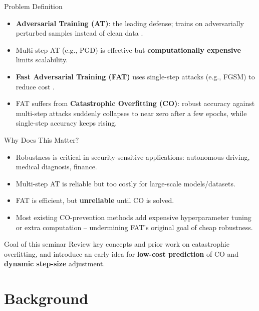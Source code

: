 \documentclass[11pt,aspectratio=169]{beamer}
\begin{document}
\begin{frame}{Problem Definition}
  \begin{itemize}
    \item \textbf{Adversarial Training (AT)}: the leading defense; trains on adversarially perturbed samples instead of clean data \cite{madry2018towards}.
    \item Multi-step AT (e.g., PGD) is effective but \textbf{computationally expensive} -- limits scalability.
    \item \textbf{Fast Adversarial Training (FAT)} uses single-step attacks (e.g., FGSM) to reduce cost \cite{wong2020fast}.
    \item FAT suffers from \textbf{Catastrophic Overfitting (CO)}: robust accuracy against multi-step attacks suddenly collapses to near zero after a few epochs, while single-step accuracy keeps rising.
  \end{itemize}
\end{frame}

\begin{frame}{Why Does This Matter?}
  \begin{itemize}
    \item Robustness is critical in security-sensitive applications: autonomous driving, medical diagnosis, finance.
    \item Multi-step AT is reliable but too costly for large-scale models/datasets.
    \item FAT is efficient, but \textbf{unreliable} until CO is solved.
    \item Most existing CO-prevention methods add expensive hyperparameter tuning or extra computation -- undermining FAT's original goal of cheap robustness.
  \end{itemize}
  \vskip 0.3cm
  \begin{block}{Goal of this seminar}
    Review key concepts and prior work on catastrophic overfitting, and introduce an early idea for \textbf{low-cost prediction} of CO and \textbf{dynamic step-size} adjustment.
  \end{block}
\end{frame}

\section{Background}
\end{document}
